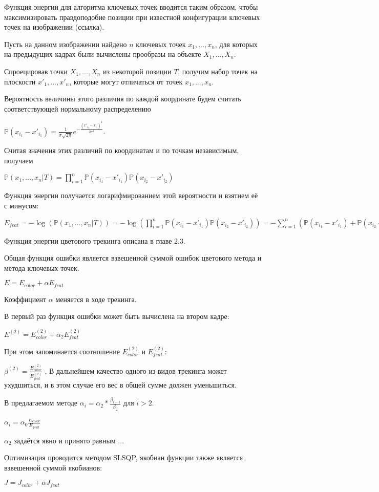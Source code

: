 Функция энергии для алгоритма ключевых точек вводится таким образом, чтобы
максимизировать правдоподобие позиции при известной конфигурации ключевых точек
на изображении (ссылка).

Пусть на данном изображении найдено $n$ ключевых точек $x_1, ..., x_n$, для
которых на предыдущих кадрах были вычислены прообразы на объекте
$X_1, ..., X_n$. 

Спроецировав точки $X_1, ..., X_n$ из некоторой позиции $T$, получим набор
точек на плоскости $x'_1, ..., x'_n$, которые могут отличаться от точек
$x_1, ..., x_n$.

Вероятность величины этого различия по каждой координате будем считать
соответствующей нормальному распределению

$
    \mathbb{P}(x_{i_1} - x'_{i_1}) = \frac{1}{\sigma \sqrt{2 \pi}}e^{- \frac{(x'_{i_1} - x_{i_1})^2}{2 \sigma^2}}
$.

Считая значения этих различий по координатам и по точкам независимым, получаем

$
    \mathbb{P}(x_1, ..., x_n | T) = \prod\limits_{i = 1}^n \mathbb{P}(x_{i_1} - x'_{i_1})\mathbb{P}(x_{i_2} - x'_{i_2})
$

Функция энергии получается логарифмированием этой вероятности и взятием её с
минусом:

$
    E_{feat} =
        - \log(\mathbb{P}(x_1, ..., x_n | T)) = 
        - \log(\prod\limits_{i = 1}^n \mathbb{P}(x_{i_1} - x'_{i_1}) \mathbb{P}(x_{i_2} - x'_{i_2})) =  - \sum\limits_{i = 1}^{n}( \mathbb{P}(x_{i_1} - x'_{i_1}) + \mathbb{P}(x_{i_2} - x'_{i_2}))
$

Функция энергии цветового трекинга описана в главе 2.3. %

Общая функция ошибки является взвешенной суммой ошибок цветового метода и
метода ключевых точек. 

$E = E_{color} + \alpha E_{feat}$

Коэффициент $\alpha$ меняется в ходе трекинга.

В первый раз функция ошибки может быть вычислена на втором кадре:

$E^{(2)} = E_{color}^{(2)} + \alpha_2 E_{feat}^{(2)}$

При этом запоминается соотношение $E_{color}^{(2)}$ и $E_{feat}^{(2)}$:

$\beta^{(2)} = \frac{E_{color}^{(2)}}{E_{feat}^{(2)}}$
,
В дальнейшем качество одного из видов трекинга может ухудшиться, и в этом
случае его вес в общей сумме должен уменьшиться.

В предлагаемом методе $\alpha_i = \alpha_2 * \frac{\beta_{i - 1}}{\beta_2}$ для $i > 2$.

$\alpha_i = \alpha_0 \frac{E_{color}}{E_{feat}}$

$\alpha_2$ задаётся явно и принято равным ...

Оптимизация проводится методом SLSQP, якобиан функции также является взвешенной
суммой якобианов:

$J = J_{color} + \alpha J_{feat}$
